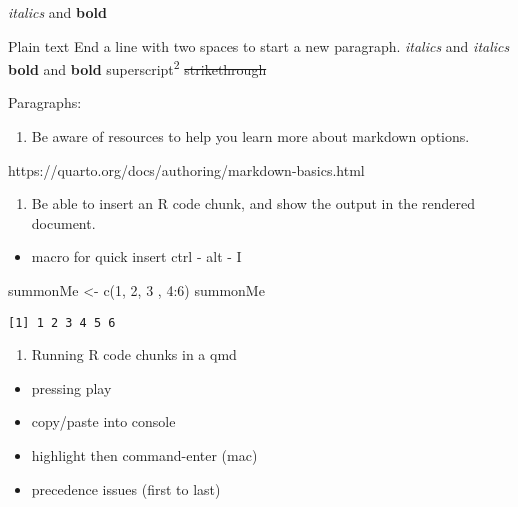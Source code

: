 \documentclass[
  letterpaper,
  DIV=11,
  numbers=noendperiod]{scrartcl}
\newenvironment{Shaded}{\begin{snugshade}}{\end{snugshade}}
\newcommand{\DecValTok}[1]{\textcolor[rgb]{0.68,0.00,0.00}{#1}}
\newcommand{\FunctionTok}[1]{\textcolor[rgb]{0.28,0.35,0.67}{#1}}
\newcommand{\NormalTok}[1]{\textcolor[rgb]{0.00,0.23,0.31}{#1}}
\newcommand{\OtherTok}[1]{\textcolor[rgb]{0.00,0.23,0.31}{#1}}
\newcommand{\SpecialCharTok}[1]{\textcolor[rgb]{0.37,0.37,0.37}{#1}}
\providecommand{\tightlist}{%
  \setlength{\itemsep}{0pt}\setlength{\parskip}{0pt}}\usepackage{longtable,booktabs,array}
\begin{document}
\emph{italics} and \textbf{bold}

Plain text End a line with two spaces to start a new paragraph.
\emph{italics} and \emph{italics} \textbf{bold} and \textbf{bold}
superscript\textsuperscript{2} \sout{strikethrough}

Paragraphs:

\begin{enumerate}
\def\labelenumi{\arabic{enumi}.}
\setcounter{enumi}{4}
\tightlist
\item
  Be aware of resources to help you learn more about markdown options.
\end{enumerate}

https://quarto.org/docs/authoring/markdown-basics.html

\begin{enumerate}
\def\labelenumi{\arabic{enumi}.}
\setcounter{enumi}{5}
\tightlist
\item
  Be able to insert an R code chunk, and show the output in the rendered
  document.
\end{enumerate}

\begin{itemize}
\tightlist
\item
  macro for quick insert ctrl - alt - I
\end{itemize}

\begin{Shaded}
\begin{Highlighting}[]
\NormalTok{  summonMe }\OtherTok{\textless{}{-}} \FunctionTok{c}\NormalTok{(}\DecValTok{1}\NormalTok{, }\DecValTok{2}\NormalTok{, }\DecValTok{3}\NormalTok{ , }\DecValTok{4}\SpecialCharTok{:}\DecValTok{6}\NormalTok{)}
\NormalTok{  summonMe}
\end{Highlighting}
\end{Shaded}

\begin{verbatim}
[1] 1 2 3 4 5 6
\end{verbatim}

\begin{enumerate}
\def\labelenumi{\arabic{enumi}.}
\setcounter{enumi}{6}
\tightlist
\item
  Running R code chunks in a qmd
\end{enumerate}

\begin{itemize}
\tightlist
\item
  pressing play
\item
  copy/paste into console
\item
  highlight then command-enter (mac)
\item
  precedence issues (first to last)
\end{itemize}
\end{document}
